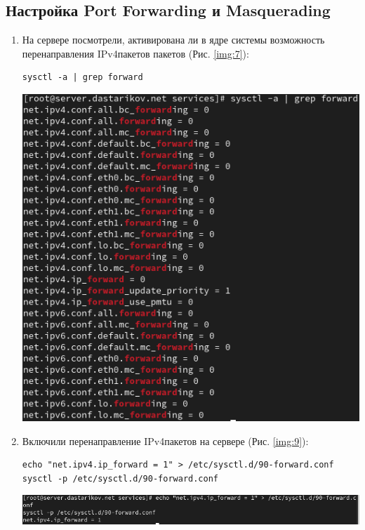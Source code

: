 \subsection{Настройка Port Forwarding и Masquerading}
\begin{enumerate}
    \item На сервере посмотрели, активирована ли в ядре системы возможность перенаправления IPv4\-пакетов пакетов (Рис. \ref{img:7}):
    \begin{verbatim}
sysctl -a | grep forward
    \end{verbatim}

\begin{center}
    \centering
    \includegraphics[width=\textwidth]{../images/image07.png}
    \label{img:7}
\end{center}

\item Включили перенаправление IPv4\-пакетов на сервере (Рис. \ref{img:9}):
    \begin{verbatim}
echo "net.ipv4.ip_forward = 1" > /etc/sysctl.d/90-forward.conf
sysctl -p /etc/sysctl.d/90-forward.conf
    \end{verbatim}

\begin{center}
    \centering
    \includegraphics[width=\textwidth]{../images/image09.png}
    \label{img:9}
\end{center}


\end{enumerate}
